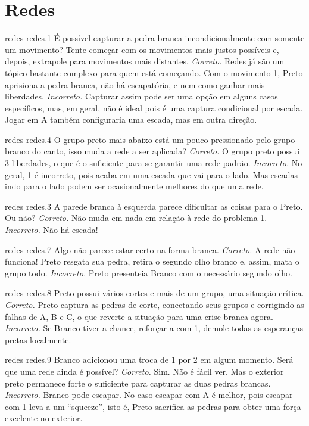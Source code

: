 \chapter{Redes}

\emptypage

\problemAnswerDiagram
  {redes}
  {redes.1}
  {É possível capturar a pedra branca incondicionalmente com somente um movimento? Tente começar com os movimentos mais justos possíveis e, depois, extrapole para movimentos mais distantes.}
  {\emph{Correto.} Redes já são um tópico bastante complexo para quem está começando. Com o movimento 1, Preto aprisiona a pedra branca, não há escapatória, e nem como ganhar mais liberdades.}
  {\emph{Incorreto.} Capturar assim pode ser uma opção em alguns casos específicos, mas, em geral, não é ideal pois é uma captura condicional por escada. Jogar em A também configuraria uma escada, mas em outra direção.}

\problemAnswerDiagram
  {redes}
  {redes.4}
  {O grupo preto mais abaixo está um pouco pressionado pelo grupo branco do canto, isso muda a rede a ser aplicada?}
  {\emph{Correto.} O grupo preto possui 3 liberdades, o que é o suficiente para se garantir uma rede padrão.}
  {\emph{Incorreto.} No geral, 1 é incorreto, pois acaba em uma escada que vai para o lado. Mas escadas indo para o lado podem ser ocasionalmente melhores do que uma rede.}

\problemAnswerDiagram
  {redes}
  {redes.3}
  {A parede branca à esquerda parece dificultar as coisas para o Preto. Ou não?}
  {\emph{Correto.} Não muda em nada em relação à rede do problema 1.}
  {\emph{Incorreto.} Não há escada!}

\problemAnswerDiagram
  {redes}
  {redes.7}
  {Algo não parece estar certo na forma branca.}
  {\emph{Correto.} A rede não funciona! Preto resgata sua pedra, retira o segundo olho branco e, assim, mata o grupo todo.}
  {\emph{Incorreto.} Preto presenteia Branco com o necessário segundo olho.}

\problemAnswerDiagram
  {redes}
  {redes.8}
  {Preto possui vários cortes e mais de um grupo, uma situação crítica.}
  {\emph{Correto.} Preto captura as pedras de corte, conectando seus grupos e corrigindo as falhas de A, B e C, o que reverte a situação para uma crise branca agora.}
  {\emph{Incorreto.} Se Branco tiver a chance, reforçar a com 1, demole todas as esperanças pretas localmente.}

\problemAnswerDiagram
  {redes}
  {redes.9}
  {Branco adicionou uma troca de 1 por 2 em algum momento. Será que uma rede ainda é possível?}
  {\emph{Correto.} Sim. Não é fácil ver. Mas o exterior preto permanece forte o suficiente para capturar as duas pedras brancas.}
  {\emph{Incorreto.} Branco pode escapar. No caso escapar com A é melhor, pois escapar com 1 leva a um ``squeeze'', isto é, Preto sacrifica as pedras para obter uma força excelente no exterior.}
  

